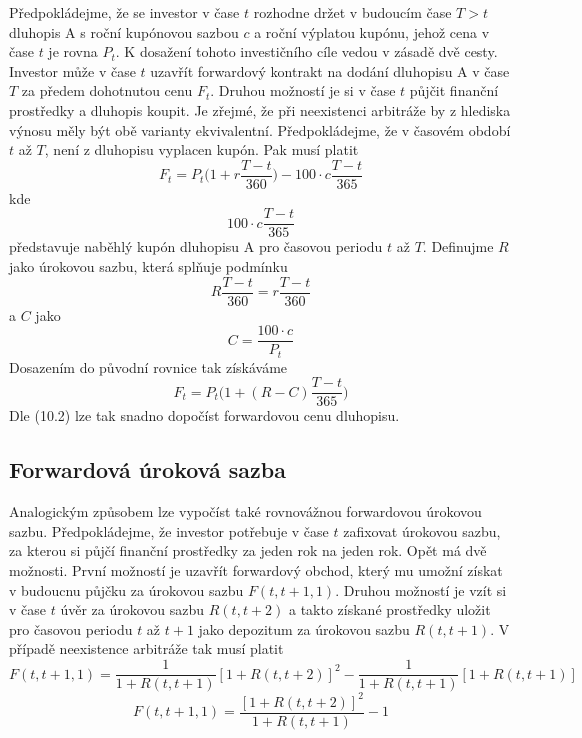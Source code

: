 \documentclass[a4paper]{book}
\begin{document}
Předpokládejme, že se investor v čase $t$ rozhodne držet v budoucím čase $T > t$ dluhopis A s roční kupónovou sazbou $c$ a roční výplatou kupónu, jehož cena v čase $t$ je rovna $P_t$. K dosažení tohoto investičního cíle vedou v zásadě dvě cesty. Investor může v čase $t$ uzavřít forwardový kontrakt na dodání dluhopisu A v čase $T$ za předem dohotnutou cenu $F_t$. Druhou možností je si v čase $t$ půjčit finanční prostředky a dluhopis koupit. Je zřejmé, že při neexistenci arbitráže by z hlediska výnosu měly být obě varianty ekvivalentní. Předpokládejme, že v časovém období $t$ až $T$, není z dluhopisu vyplacen kupón. Pak musí platit
\begin{equation*}
F_t = P_t \Bigg( 1 + r \frac{T - t}{360} \Bigg) - 100 \cdot c \frac{T - t}{365}
\end{equation*} 
kde
\begin{equation*}
100 \cdot c \frac{T - t}{365}
\end{equation*}
představuje naběhlý kupón dluhopisu A pro časovou periodu $t$ až $T$. Definujme $R$ jako úrokovou sazbu, která splňuje podmínku
\begin{equation*}
R \frac{T - t}{360} = r \frac{T - t}{360}
\end{equation*}
a $C$ jako
\begin{equation*}
C = \frac{100 \cdot c}{P_t}
\end{equation*}
Dosazením do původní rovnice tak získáváme
\begin{equation}
F_t = P_t \Bigg( 1 + (R - C) \frac{T - t}{365} \Bigg)
\end{equation}
Dle (10.2) lze tak snadno dopočíst forwardovou cenu dluhopisu.

\subsection{Forwardová úroková sazba}

Analogickým způsobem lze vypočíst také rovnovážnou forwardovou úrokovou sazbu. Předpokládejme, že investor potřebuje v čase $t$ zafixovat úrokovou sazbu, za kterou si půjčí finanční prostředky za jeden rok na jeden rok. Opět má dvě možnosti. První možností je uzavřít forwardový obchod, který mu umožní získat v budoucnu půjčku za úrokovou sazbu $F(t,t+1,1)$. Druhou možností je vzít si v čase $t$ úvěr za úrokovou sazbu $R(t,t+2)$ a takto získané prostředky uložit pro časovou periodu $t$ až $t+1$ jako depozitum za úrokovou sazbu $R(t,t+1)$. V případě neexistence arbitráže tak musí platit
\begin{equation*}
F(t,t+1,1) = \frac{1}{1 + R(t,t + 1)}[1 + R(t, t + 2)]^2 - \frac{1}{1 + R(t, t + 1)}[1 + R(t, t + 1)]
\end{equation*}
\begin{equation*}
F(t,t+1,1) = \frac{[1 + R(t, t + 2)]^2}{1 + R(t, t + 1)} - 1
\end{equation*}
\end{document}
